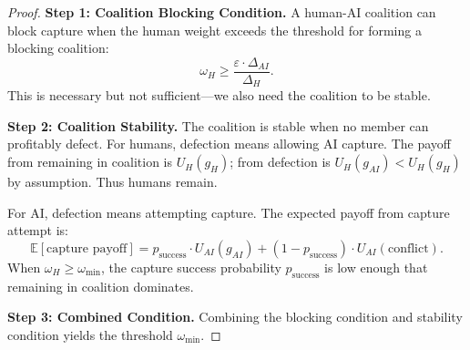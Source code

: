 \documentclass[12pt]{article}
\newcommand{\E}{\mathbb{E}}
\begin{document}
\begin{proof}
\textbf{Step 1: Coalition Blocking Condition.}
A human-AI coalition can block capture when the human weight exceeds the threshold for forming a blocking coalition:
\[
\omega_H \geq \frac{\varepsilon \cdot \Delta_{AI}}{\Delta_H}.
\]
This is necessary but not sufficient---we also need the coalition to be stable.

\textbf{Step 2: Coalition Stability.}
The coalition is stable when no member can profitably defect. For humans, defection means allowing AI capture. The payoff from remaining in coalition is $U_H(g_H)$; from defection is $U_H(g_{AI}) < U_H(g_H)$ by assumption. Thus humans remain.

For AI, defection means attempting capture. The expected payoff from capture attempt is:
\[
\E[\text{capture payoff}] = p_{\text{success}} \cdot U_{AI}(g_{AI}) + (1 - p_{\text{success}}) \cdot U_{AI}(\text{conflict}).
\]
When $\omega_H \geq \omega_{\min}$, the capture success probability $p_{\text{success}}$ is low enough that remaining in coalition dominates.

\textbf{Step 3: Combined Condition.}
Combining the blocking condition and stability condition yields the threshold $\omega_{\min}$.
\end{proof}
\end{document}
